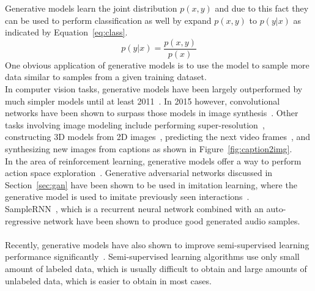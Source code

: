 Generative models learn the joint distribution $p(x,y)$ and due to this fact they can be used to perform classification as well by expand $p(x,y)$ to $p(y|x)$ as indicated by Equation~\ref{eq:class}.
\begin{equation}
  \label{eq:class}
  p(y|x) = \frac{p(x,y)}{p(x)}
\end{equation}
%
One obvious application of generative models is to use the model to sample more data similar to samples from a given training dataset.\\
%
In computer vision tasks, generative models have been largely outperformed by much simpler models until at least 2011~\cite{thesis:2011}. In 2015 however, convolutional networks have been shown to surpass those models in image synthesis~\cite{synthesis:2015}.
Other tasks involving image modeling include performing super-resolution~\cite{superres:2017}, constructing 3D models from 2D images~\cite{gan_3d:2016}, predicting the next video frames~\cite{gan_video:2016}, and synthesizing new images from captions as shown in Figure~\ref{fig:caption2img}.\\
%
In the area of reinforcement learning, generative models offer a way to perform action space exploration~\cite{rl_variational:2016}. Generative adversarial networks discussed in Section~\ref{sec:gan} have been shown to be used in imitation learning, where the generative model is used to imitate previously seen interactions~\cite{imitation_learning:2016}.\\
%
SampleRNN~\cite{samplernn:2016}, which is a recurrent neural network combined with an auto-regressive network have been shown to produce good generated audio samples.\\\\
%
Recently, generative models have also shown to improve semi-supervised learning performance significantly~\cite{cvae:2014}. Semi-supervised learning algorithms use only small amount of labeled data, which is usually difficult to obtain and large amounts of unlabeled data, which is easier to obtain in most cases.



\newpage
